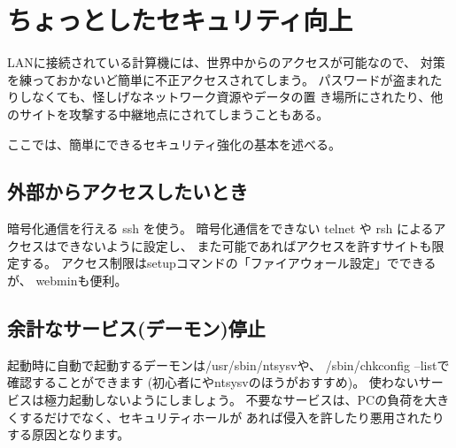 \documentclass{jreport}
\begin{document}
\section{ちょっとしたセキュリティ向上}

LANに接続されている計算機には、世界中からのアクセスが可能なので、
対策を練っておかないど簡単に不正アクセスされてしまう。
パスワードが盗まれたりしなくても、怪しげなネットワーク資源やデータの置
き場所にされたり、他のサイトを攻撃する中継地点にされてしまうこともある。

ここでは、簡単にできるセキュリティ強化の基本を述べる。


\subsection{外部からアクセスしたいとき}

暗号化通信を行える ssh を使う。
暗号化通信をできない telnet や rsh によるアクセスはできないように設定し、
また可能であればアクセスを許すサイトも限定する。
アクセス制限はsetupコマンドの「ファイアウォール設定」でできるが、
webminも便利。


\subsection{余計なサービス(デーモン)停止}

起動時に自動で起動するデーモンは{\ttfamily /usr/sbin/ntsysv}や、
{\ttfamily /sbin/chkconfig --list}で確認することができます
(初心者にやntsysvのほうがおすすめ)。
使わないサービスは極力起動しないようにしましょう。
不要なサービスは、PCの負荷を大きくするだけでなく、セキュリティホールが
あれば侵入を許したり悪用されたりする原因となります。





\end{document}
